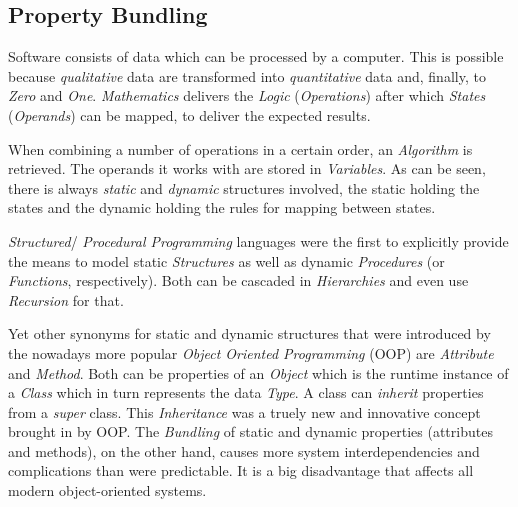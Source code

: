 %
%
%
%
%
%
%

\subsection{Property Bundling}
\label{property_bundling_heading}

Software consists of data which can be processed by a computer. This is possible
because \emph{qualitative} data are transformed into \emph{quantitative} data and,
finally, to \emph{Zero} and \emph{One}. \emph{Mathematics} delivers the \emph{Logic}
(\emph{Operations}) after which \emph{States} (\emph{Operands}) can be mapped,
to deliver the expected results.

When combining a number of operations in a certain order, an \emph{Algorithm} is
retrieved. The operands it works with are stored in \emph{Variables}. As can be
seen, there is always \emph{static} and \emph{dynamic} structures involved, the
static holding the states and the dynamic holding the rules for mapping between
states.

\emph{Structured}/ \emph{Procedural Programming} languages were the first to
explicitly provide the means to model static \emph{Structures} as well as dynamic
\emph{Procedures} (or \emph{Functions}, respectively). Both can be cascaded in
\emph{Hierarchies} and even use \emph{Recursion} for that.

Yet other synonyms for static and dynamic structures that were introduced by the
nowadays more popular \emph{Object Oriented Programming} (OOP) are \emph{Attribute}
and \emph{Method}. Both can be properties of an \emph{Object} which is the runtime
instance of a \emph{Class} which in turn represents the data \emph{Type}. A class
can \emph{inherit} properties from a \emph{super} class. This \emph{Inheritance}
was a truely new and innovative concept brought in by OOP. The \emph{Bundling} of
static and dynamic properties (attributes and methods), on the other hand, causes
more system interdependencies and complications than were predictable. It is a big
disadvantage that affects all modern object-oriented systems.

